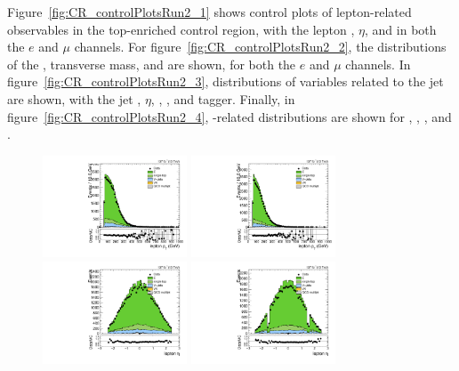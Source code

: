Figure~\ref{fig:CR_controlPlotsRun2_1} shows control plots of lepton-related observables in the top-enriched control region, with the lepton \pt, $\eta$, and \ptmiss in both the $e$ and $\mu$ channels.
For figure~\ref{fig:CR_controlPlotsRun2_2}, the distributions of the \Wlep \pt, transverse mass, and \MVV are shown, for both the $e$ and $\mu$ channels.
In figure~\ref{fig:CR_controlPlotsRun2_3}, distributions of variables related to the \Vhad jet are shown, with the jet \pt, $\eta$, \MJ, \nsubjDDT, and \DoubleB tagger.
Finally, in figure~\ref{fig:CR_controlPlotsRun2_4}, \VBF-related distributions are shown for \DetaVBF, \mjjVBF, \nJets, and \Dy.

\begin{figure}[htbp]
  \centering
  \includegraphics[width=0.3825\textwidth]{fig/controlPlots/CR_b1_mu_allP_allC_allD_Run2_lnujj_l1_l_pt.pdf}
  \includegraphics[width=0.3825\textwidth]{fig/controlPlots/CR_b1_e_allP_allC_allD_Run2_lnujj_l1_l_pt.pdf}\\
  \includegraphics[width=0.3825\textwidth]{fig/controlPlots/CR_b1_mu_allP_allC_allD_Run2_lnujj_l1_l_eta.pdf}
  \includegraphics[width=0.3825\textwidth]{fig/controlPlots/CR_b1_e_allP_allC_allD_Run2_lnujj_l1_l_eta.pdf}\\

\end{figure}
